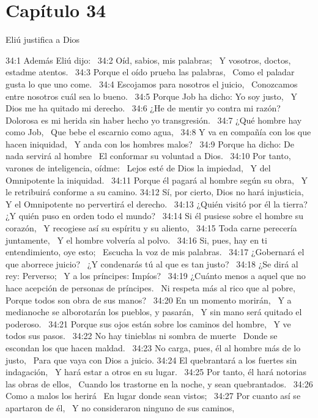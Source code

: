 \section*{Capítulo 34 }
Eliú justifica a Dios  

34:1 Además Eliú dijo:  
34:2 Oíd, sabios, mis palabras;  
Y vosotros, doctos, estadme atentos.  
34:3 Porque el oído prueba las palabras,  
Como el paladar gusta lo que uno come.  
34:4 Escojamos para nosotros el juicio,  
Conozcamos entre nosotros cuál sea lo bueno.  
34:5 Porque Job ha dicho: Yo soy justo,  
Y Dios me ha quitado mi derecho.  
34:6 ¿He de mentir yo contra mi razón?  
Dolorosa es mi herida sin haber hecho yo transgresión.  
34:7 ¿Qué hombre hay como Job,  
Que bebe el escarnio como agua,  
34:8 Y va en compañía con los que hacen iniquidad,  
Y anda con los hombres malos?  
34:9 Porque ha dicho: De nada servirá al hombre  
El conformar su voluntad a Dios.  
34:10 Por tanto, varones de inteligencia, oídme:  
Lejos esté de Dios la impiedad,  
Y del Omnipotente la iniquidad.  
34:11 Porque él pagará al hombre según su obra,  
Y le retribuirá conforme a su camino. 
34:12 Sí, por cierto, Dios no hará injusticia,  
Y el Omnipotente no pervertirá el derecho.  
34:13 ¿Quién visitó por él la tierra?  
¿Y quién puso en orden todo el mundo?  
34:14 Si él pusiese sobre el hombre su corazón,  
Y recogiese así su espíritu y su aliento,  
34:15 Toda carne perecería juntamente,  
Y el hombre volvería al polvo.  
34:16 Si, pues, hay en ti entendimiento, oye esto;  
Escucha la voz de mis palabras.  
34:17 ¿Gobernará el que aborrece juicio?  
¿Y condenarás tú al que es tan justo?  
34:18 ¿Se dirá al rey: Perverso;  
Y a los príncipes: Impíos?  
34:19 ¿Cuánto menos a aquel que no hace acepción de personas de príncipes.  
Ni respeta más al rico que al pobre,  
Porque todos son obra de sus manos?  
34:20 En un momento morirán,  
Y a medianoche se alborotarán los pueblos, y pasarán,  
Y sin mano será quitado el poderoso.  
34:21 Porque sus ojos están sobre los caminos del hombre,  
Y ve todos sus pasos.  
34:22 No hay tinieblas ni sombra de muerte  
Donde se escondan los que hacen maldad.  
34:23 No carga, pues, él al hombre más de lo justo,  
Para que vaya con Dios a juicio. 
34:24 El quebrantará a los fuertes sin indagación,  
Y hará estar a otros en su lugar.  
34:25 Por tanto, él hará notorias las obras de ellos,  
Cuando los trastorne en la noche, y sean quebrantados.  
34:26 Como a malos los herirá  
En lugar donde sean vistos;  
34:27 Por cuanto así se apartaron de él,  
Y no consideraron ninguno de sus caminos,  
